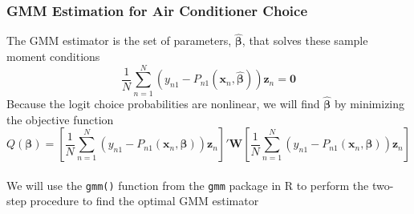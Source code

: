 \documentclass{beamer}\usepackage[]{graphicx}\usepackage[]{color}
\begin{document}
\begin{frame}\frametitle{GMM Estimation for Air Conditioner Choice}
    The GMM estimator is the set of parameters, $\widehat{\bm{\beta}}$, that solves these sample moment conditions
    $$\frac{1}{N} \sum_{n = 1}^N \left( y_{n1} - P_{n1}(\bm{x}_n, \widehat{\bm{\beta}}) \right) \bm{z}_n = \bm{0}$$
    Because the logit choice probabilities are nonlinear, we will find $\widehat{\bm{\beta}}$ by minimizing the objective function 
    $$Q(\bm{\beta}) = \left[ \frac{1}{N} \sum_{n = 1}^N \left( y_{n1} - P_{n1}(\bm{x}_n, \bm{\beta}) \right) \bm{z}_n \right]' \bm{W} \left[ \frac{1}{N} \sum_{n = 1}^N \left( y_{n1} - P_{n1}(\bm{x}_n, \bm{\beta}) \right) \bm{z}_n \right]$$ \\
    \vspace{3ex}
    We will use the \texttt{gmm()} function from the \texttt{gmm} package in R to perform the two-step procedure to find the optimal GMM estimator
\end{frame}
\end{document}
